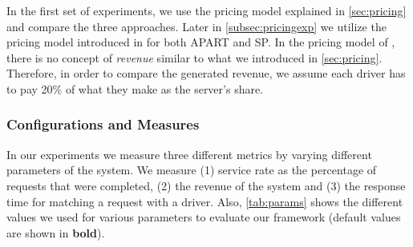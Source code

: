 In the first set of experiments, we use the pricing model explained in \cref{sec:pricing} and compare the three approaches. Later in \cref{subsec:pricingexp} we utilize the pricing model introduced in \cite{Ma15} for both APART and SP. In the pricing model of \cite{Ma15}, there is no concept of \textit{revenue} similar to what we introduced in \cref{sec:pricing}. Therefore, in order to compare the generated revenue, we assume each driver has to pay 20\% of what they make as the server's share.

\subsubsection{Configurations and Measures}
In our experiments we measure three different metrics by varying different parameters of the system. We measure (1) service rate as the percentage of requests that were completed, (2) the revenue of the system and (3) the response time for matching a request with a driver. Also, \cref{tab:params} shows the different values we used for various parameters to evaluate our framework (default values are shown in \textbf{bold}).


